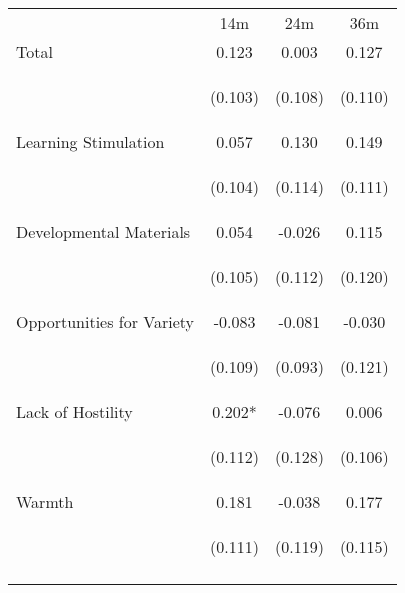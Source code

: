 \begin{tabular}{lccc}
\hline \noalign{\smallskip} & 14m & 24m & 36m\\
\noalign{\smallskip}\hline \noalign{\smallskip}Total & 0.123 & 0.003 & 0.127\\
 & \begin{footnotesize}(0.103)\end{footnotesize} & \begin{footnotesize}(0.108)\end{footnotesize} & \begin{footnotesize}(0.110)\end{footnotesize}\\
\noalign{\smallskip}Learning Stimulation & 0.057 & 0.130 & 0.149\\
 & \begin{footnotesize}(0.104)\end{footnotesize} & \begin{footnotesize}(0.114)\end{footnotesize} & \begin{footnotesize}(0.111)\end{footnotesize}\\
\noalign{\smallskip}Developmental Materials & 0.054 & -0.026 & 0.115\\
 & \begin{footnotesize}(0.105)\end{footnotesize} & \begin{footnotesize}(0.112)\end{footnotesize} & \begin{footnotesize}(0.120)\end{footnotesize}\\
\noalign{\smallskip}Opportunities for Variety & -0.083 & -0.081 & -0.030\\
 & \begin{footnotesize}(0.109)\end{footnotesize} & \begin{footnotesize}(0.093)\end{footnotesize} & \begin{footnotesize}(0.121)\end{footnotesize}\\
\noalign{\smallskip}Lack of Hostility & 0.202* & -0.076 & 0.006\\
 & \begin{footnotesize}(0.112)\end{footnotesize} & \begin{footnotesize}(0.128)\end{footnotesize} & \begin{footnotesize}(0.106)\end{footnotesize}\\
\noalign{\smallskip}Warmth & 0.181 & -0.038 & 0.177\\
 & \begin{footnotesize}(0.111)\end{footnotesize} & \begin{footnotesize}(0.119)\end{footnotesize} & \begin{footnotesize}(0.115)\end{footnotesize}\\
\noalign{\smallskip}\hline\end{tabular}\\
